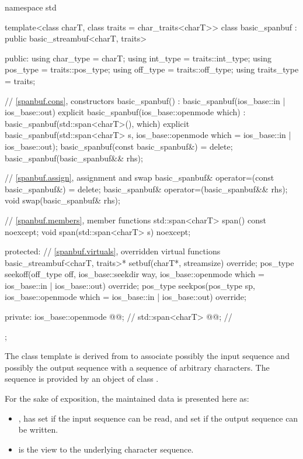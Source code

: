 %
\begin{codeblock}
namespace std {
  template<class charT, class traits = char_traits<charT>>
  class basic_spanbuf
    : public basic_streambuf<charT, traits> {
  public:
    using char_type   = charT;
    using int_type    = traits::int_type;
    using pos_type    = traits::pos_type;
    using off_type    = traits::off_type;
    using traits_type = traits;

    // \ref{spanbuf.cons}, constructors
    basic_spanbuf() : basic_spanbuf(ios_base::in | ios_base::out) {}
    explicit basic_spanbuf(ios_base::openmode which)
      : basic_spanbuf(std::span<charT>(), which) {}
    explicit basic_spanbuf(std::span<charT> s,
                           ios_base::openmode which = ios_base::in | ios_base::out);
    basic_spanbuf(const basic_spanbuf&) = delete;
    basic_spanbuf(basic_spanbuf&& rhs);

    // \ref{spanbuf.assign}, assignment and swap
    basic_spanbuf& operator=(const basic_spanbuf&) = delete;
    basic_spanbuf& operator=(basic_spanbuf&& rhs);
    void swap(basic_spanbuf& rhs);

    // \ref{spanbuf.members}, member functions
    std::span<charT> span() const noexcept;
    void span(std::span<charT> s) noexcept;

  protected:
    // \ref{spanbuf.virtuals}, overridden virtual functions
    basic_streambuf<charT, traits>* setbuf(charT*, streamsize) override;
    pos_type seekoff(off_type off, ios_base::seekdir way,
                     ios_base::openmode which = ios_base::in | ios_base::out) override;
    pos_type seekpos(pos_type sp,
                     ios_base::openmode which = ios_base::in | ios_base::out) override;

  private:
    ios_base::openmode @@;            // \expos
    std::span<charT> @@;               // \expos
  };
}
\end{codeblock}

\pnum
The class template  is derived from 
to associate possibly the input sequence and possibly the output sequence
with a sequence of arbitrary characters.
The sequence is provided by an object of class .

\pnum
For the sake of exposition, the maintained data is presented here as:
\begin{itemize}
\item
{}, has
 set if the input sequence can be read, and
 set if the output sequence can be written.
\item
{} is the view to
the underlying character sequence.
\end{itemize}

